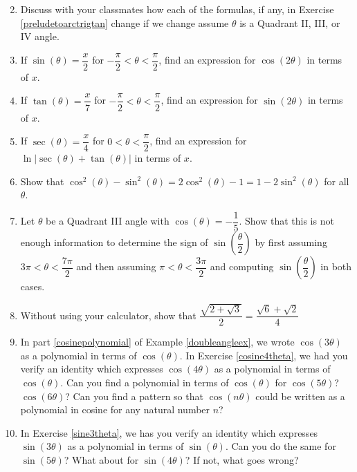\begin{enumerate}
\begin{multicols}{2}
\begin{enumerate}
\end{enumerate}

\end{multicols}

\item  Discuss with your classmates how each of the formulas, if any, in Exercise \ref{preludetoarctrigtan} change if we change assume $\theta$ is a Quadrant II, III, or IV angle.

\item If $\sin(\theta) = \dfrac{x}{2}$ for $-\dfrac{\pi}{2} < \theta < \dfrac{\pi}{2}$, find an expression for $\cos(2\theta)$ in terms of $x$.

\item If $\tan(\theta) = \dfrac{x}{7}$ for $-\dfrac{\pi}{2} < \theta < \dfrac{\pi}{2}$, find an expression for $\sin(2\theta)$ in terms of $x$.

\item If $\sec(\theta) = \dfrac{x}{4}$ for $0 < \theta < \dfrac{\pi}{2}$, find an expression for $\ln|\sec(\theta) + \tan(\theta)|$ in terms of $x$.

\item Show that $\cos^{2}(\theta) - \sin^{2}(\theta) = 2\cos^{2}(\theta) - 1 = 1 - 2\sin^{2}(\theta)$ for all $\theta$.

\item Let $\theta$ be a Quadrant III angle with $\cos(\theta) = -\dfrac{1}{5}$.  Show that this is not enough information to determine the sign of  $\sin\left(\dfrac{\theta}{2}\right)$ by first assuming $3\pi < \theta < \dfrac{7\pi}{2}$ and then assuming $\pi < \theta < \dfrac{3\pi}{2}$ and computing $\sin\left(\dfrac{\theta}{2}\right)$ in both cases.

\item Without using your calculator, show that $\dfrac{\sqrt{2 + \sqrt{3}}}{2} = \dfrac{\sqrt{6} + \sqrt{2}}{4}$

\item In part \ref{cosinepolynomial} of Example \ref{doubleangleex}, we wrote $\cos(3\theta)$ as a polynomial in terms of $\cos(\theta)$.  In Exercise \ref{cosine4theta}, we had you verify an identity which expresses $\cos(4\theta)$ as a polynomial in terms of $\cos(\theta)$.   Can you find a polynomial in terms of $\cos(\theta)$ for $\cos(5\theta)$?  $\cos(6\theta)$?  Can you find a pattern so that $\cos(n\theta)$ could be written as a polynomial in cosine for any natural number $n$?

\item In Exercise \ref{sine3theta}, we has you verify an identity which expresses $\sin(3\theta)$ as a polynomial in terms of $\sin(\theta)$.   Can you do the same for  $\sin(5\theta)$?  What about for $\sin(4\theta)$?  If not, what goes wrong?

\setcounter{HW}{\value{enumi}}

\end{enumerate}

